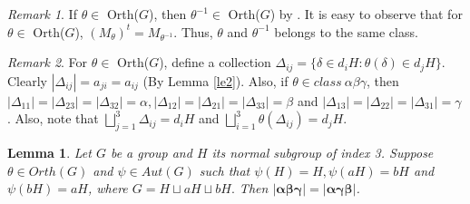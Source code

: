 \documentclass[11pt,a4paper]{article}
\newtheorem{lemma}[theorem]{Lemma}
\theoremstyle{definition}
\theoremstyle{remark}
\newtheorem{remark}{Remark}
\begin{document}
	\begin{remark}\label{re2}
		If $\theta \in $ Orth($G$), then $\theta^{-1} \in$ Orth($G$) by \cite[Theorem 8.7, p. 207]{evans}. It is easy to observe that for $\theta \in$ Orth($G$), $(M_{\theta})^{t} = M_{\theta^{-1}}$. Thus, $\theta$ and $\theta^{-1}$ belongs to the same class.
	\end{remark}
	\begin{remark}\label{re3}
		For $\theta \in$ Orth($G$), define a collection $\Delta_{ij} = \{\delta \in d_{i}H: \theta(\delta) \in d_{j}H\}.$ Clearly $|\Delta_{ij}| = a_{ji} = a_{ij}$ (By Lemma \ref{le2}). Also, if $\theta \in class~\alpha\beta\gamma$, then $|\Delta_{11}| = |\Delta_{23}| = |\Delta_{32}| = \alpha, |\Delta_{12}| = |\Delta_{21}| = |\Delta_{33}| = \beta$ and $|\Delta_{13}| = |\Delta_{22}| = |\Delta_{31}| = \gamma$. Also, note that $ \displaystyle	 \bigsqcup_{j = 1}^{3}\Delta_{ij} = d_{i}H $ and $\displaystyle \bigsqcup_{i = 1}^{3}\theta(\Delta_{ij}) = d_{j}H$.  %
	
	\end{remark}
	\begin{lemma}\label{le3}
		Let $G$ be a group and $H$ its normal subgroup of index 3. Suppose $\theta \in Orth(G)$ and $\psi \in Aut(G)$ such that $\psi(H) = H, \psi(aH) = bH$ and $\psi(bH) = aH$, where $G = H \sqcup aH \sqcup bH.$ Then  $\bm{|\alpha \beta \gamma| = |\alpha \gamma \beta|}$.
	\end{lemma}
\end{document}
